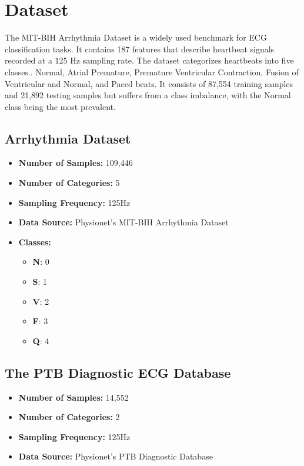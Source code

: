 \documentclass[a4paper,12pt]{article}
\begin{document}
\section{Dataset}
The MIT-BIH Arrhythmia Dataset is a widely used benchmark for ECG classification tasks. It contains 187 features that describe heartbeat signals recorded at a 125 Hz sampling rate. The dataset categorizes heartbeats into five classes.. Normal, Atrial Premature, Premature Ventricular Contraction, Fusion of Ventricular and Normal, and Paced beats. It consists of 87,554 training samples and 21,892 testing samples but suffers from a class imbalance, with the Normal class being the most prevalent.

\subsection{Arrhythmia Dataset}
\begin{itemize}
    \item \textbf{Number of Samples:} 109,446
    \item \textbf{Number of Categories:} 5
    \item \textbf{Sampling Frequency:} 125Hz
    \item \textbf{Data Source:} Physionet's MIT-BIH Arrhythmia Dataset
    \item \textbf{Classes:} 
    \begin{itemize}
        \item \textbf{N}: 0
        \item \textbf{S}: 1
        \item \textbf{V}: 2
        \item \textbf{F}: 3
        \item \textbf{Q}: 4
    \end{itemize}
\end{itemize}

\subsection{The PTB Diagnostic ECG Database}
\begin{itemize}
    \item \textbf{Number of Samples:} 14,552
    \item \textbf{Number of Categories:} 2
    \item \textbf{Sampling Frequency:} 125Hz
    \item \textbf{Data Source:} Physionet's PTB Diagnostic Database
\end{itemize}
\end{document}
